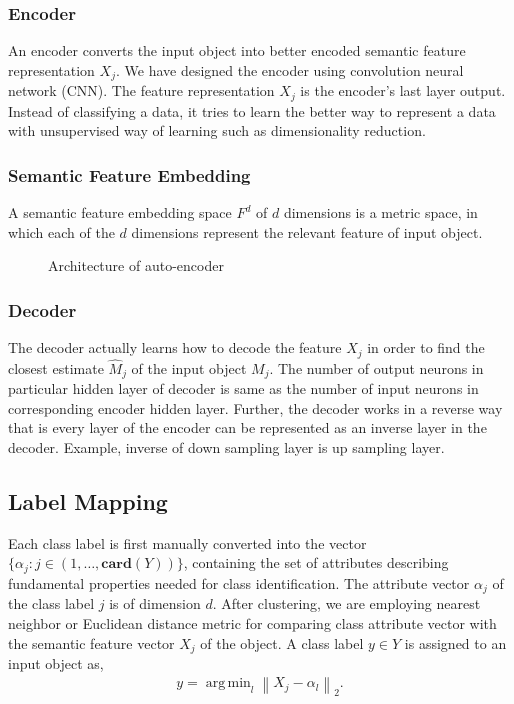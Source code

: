 \documentclass[11pt, conference, english]{IEEEtran}
\theoremstyle{plain}
\theoremstyle{definition}
\theoremstyle{remark}
\newcommand{\eq}[1]{\begin{align*}#1\end{align*}}
\newcommand{\norm}[1]{\left\lVert#1\right\rVert}
\DeclareMathOperator*{\argmin}{arg\,min}
\begin{document}
	\subsubsection{Encoder}
	An encoder converts the input object into better encoded semantic feature representation $X_j$.
	We have designed the encoder using convolution neural network (CNN).
	The feature representation $X_j$ is the encoder's last layer output. Instead of classifying a data, it tries to learn the better way to represent a data with unsupervised way of learning such as dimensionality reduction.
	
	\subsubsection{Semantic Feature Embedding}
	A semantic feature embedding space $F^d$ of $d$ dimensions is a metric space, in which each of the $d$ dimensions represent the relevant feature of input object.

	
	
	\begin{figure}[h!]
		\centering
		\scalebox{.5}{}
		\caption{Architecture of auto-encoder}
		\label{Fig:SystemModel2}
	\end{figure}
		\subsubsection{Decoder}
		The decoder actually learns how to decode the  feature $X_j$ in order to find the closest estimate $\hat{M}_j$ of the input object $M_j$.
		The number of output neurons in particular hidden layer of decoder is same as the number of input neurons in corresponding encoder hidden layer. Further, the decoder works in a reverse way that is every layer of the encoder can be represented as an inverse layer in the decoder.
		Example, inverse of down sampling layer is up sampling layer. 
	\subsection{Label Mapping}
	Each class label is first manually converted into the vector $\{\alpha_j: j\in (1,\dots,\mathbf{card}(Y))\}$,
	containing the set of attributes describing fundamental properties needed for class identification. The attribute vector $\alpha_j$ of the class label $j$ is of dimension $d$. After clustering, we are employing nearest neighbor or Euclidean distance metric for comparing class attribute vector with the semantic feature vector $X_j$ of the object. A class label $y\in Y$ is assigned to an input object as,
	\eq{y=\argmin_l \norm{X_j-\alpha_l}_2.}
\end{document}

